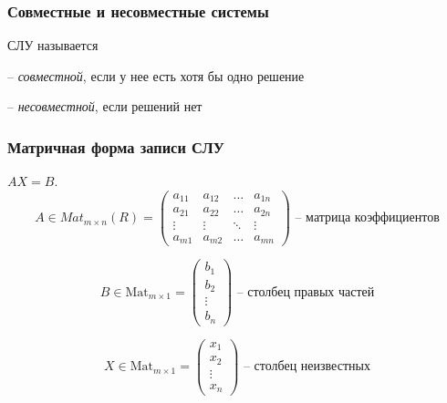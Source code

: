 \subsubsection{Совместные и несовместные системы}
\begin{definition}
    СЛУ называется 

    -- \textit{совместной}, если у нее есть хотя бы одно решение

    -- \textit{несовместной}, если решений нет
\end{definition}

\subsubsection{Матричная форма записи СЛУ}

$AX = B$.
\begin{equation*}
    A \in Mat_{m \times n}(R) = \begin{pmatrix}
        a_{11} & a_{12} & \dots & a_{1n} \\
        a_{21} & a_{22} & \dots & a_{2n} \\
        \vdots & \vdots & \ddots & \vdots \\
        a_{m1} & a_{m2} & \dots & a_{mn}
    \end{pmatrix} \text{ -- матрица коэффициентов}
\end{equation*}

\begin{equation*}
    B \in \text{Mat}_{m \times 1} = \begin{pmatrix}
        b_1 \\ b_2 \\ \vdots \\ b_n
    \end{pmatrix} \text{ -- столбец правых частей}
\end{equation*}

\begin{equation*}
    X \in \text{Mat}_{m \times 1} = \begin{pmatrix}
        x_1 \\ x_2 \\ \vdots \\ x_n
    \end{pmatrix} \text{ -- столбец неизвестных}
\end{equation*} 
